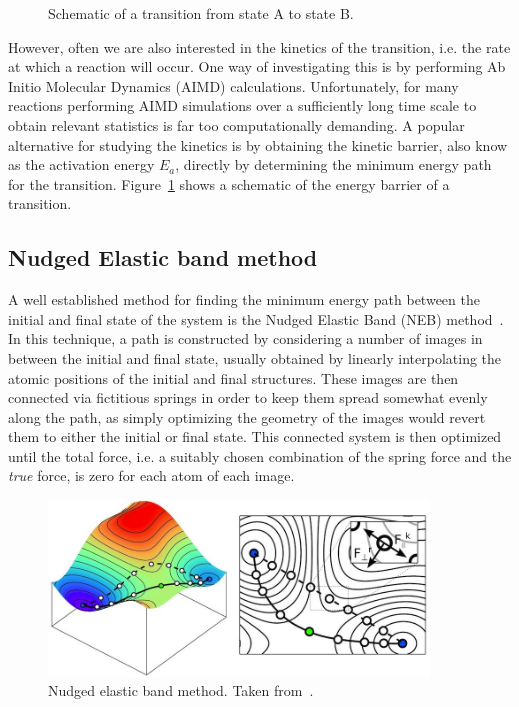 \begin{refsection}
\begin{figure}[ht] 
\centering
 
\caption{\label{dft:fig-transition}Schematic of a transition from state A to state 
B.} 
\end{figure} 
 
However, often we are also interested in the kinetics of the transition, i.e. the 
rate at which a reaction will occur. One way of investigating this is by 
performing Ab Initio Molecular Dynamics (AIMD) calculations. Unfortunately, 
for many reactions performing AIMD simulations over a sufficiently long time 
scale to obtain relevant statistics is far too computationally demanding. A 
popular alternative for studying the kinetics is by obtaining the kinetic barrier, 
also know as the activation energy $E_a$, directly  
by determining the minimum energy path for the 
transition. Figure~\ref{dft:fig-transition} shows a schematic of the energy 
barrier of a transition. 
 
\subsection{Nudged Elastic band method} \label{dft:sec-neb} 
 
A well established method for finding the minimum energy path between the 
initial and final state of the system is the Nudged Elastic Band (NEB) 
method~\cite{Jonsson1998, Henkelman2000}. In this technique, a path is 
constructed by considering a number of images in between the initial and final 
state, usually obtained by linearly interpolating the atomic positions of the initial and final 
structures. These images are then connected via fictitious springs in order to keep 
them spread somewhat evenly along the path, as simply optimizing the geometry 
of the images would revert them to either the initial or final state. This 
connected system is then optimized until the total force, i.e. a suitably 
chosen combination of the spring force and the \textit{true} force, is zero 
for each atom of each image.

\begin{figure}[ht] 
\centering
\includegraphics[width=0.9\textwidth]{figures/DFT/neb.jpg} 
\caption{\label{dft:fig-neb} Nudged elastic band method. Taken from~\cite{RheoMan2019}.} 
\end{figure} 


\end{refsection}
